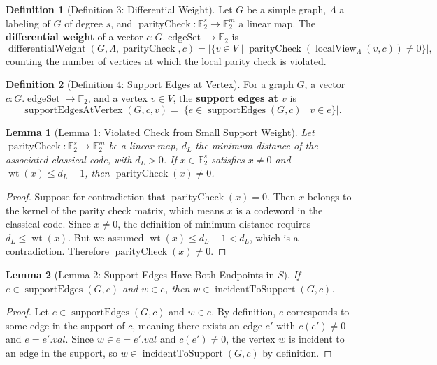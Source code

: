\documentclass[11pt]{article}
\theoremstyle{plain}
\newtheorem*{lemma}{Lemma}
\theoremstyle{definition}
\newtheorem*{definition}{Definition}
\theoremstyle{remark}
\begin{document}
\begin{definition}[Definition 3: Differential Weight]
Let $G$ be a simple graph, $\Lambda$ a labeling of $G$ of degree $s$, and $\operatorname{parityCheck} : \mathbb{F}_2^s \to \mathbb{F}_2^m$ a linear map. The \textbf{differential weight} of a vector $c : G.\operatorname{edgeSet} \to \mathbb{F}_2$ is
\[
\operatorname{differentialWeight}(G, \Lambda, \operatorname{parityCheck}, c) = \bigl|\{v \in V \mid \operatorname{parityCheck}(\operatorname{localView}_\Lambda(v, c)) \neq 0\}\bigr|,
\]
counting the number of vertices at which the local parity check is violated.
\end{definition}

\begin{definition}[Definition 4: Support Edges at Vertex]
For a graph $G$, a vector $c : G.\operatorname{edgeSet} \to \mathbb{F}_2$, and a vertex $v \in V$, the \textbf{support edges at $v$} is
\[
\operatorname{supportEdgesAtVertex}(G, c, v) = \bigl|\{e \in \operatorname{supportEdges}(G, c) \mid v \in e\}\bigr|.
\]
\end{definition}

\begin{lemma}[Lemma 1: Violated Check from Small Support Weight]
Let $\operatorname{parityCheck} : \mathbb{F}_2^s \to \mathbb{F}_2^m$ be a linear map, $d_L$ the minimum distance of the associated classical code, with $d_L > 0$. If $x \in \mathbb{F}_2^s$ satisfies $x \neq 0$ and $\operatorname{wt}(x) \leq d_L - 1$, then $\operatorname{parityCheck}(x) \neq 0$.
\end{lemma}

\begin{proof}
Suppose for contradiction that $\operatorname{parityCheck}(x) = 0$. Then $x$ belongs to the kernel of the parity check matrix, which means $x$ is a codeword in the classical code. Since $x \neq 0$, the definition of minimum distance requires $d_L \leq \operatorname{wt}(x)$. But we assumed $\operatorname{wt}(x) \leq d_L - 1 < d_L$, which is a contradiction. Therefore $\operatorname{parityCheck}(x) \neq 0$.
\end{proof}

\begin{lemma}[Lemma 2: Support Edges Have Both Endpoints in $S$]
If $e \in \operatorname{supportEdges}(G, c)$ and $w \in e$, then $w \in \operatorname{incidentToSupport}(G, c)$.
\end{lemma}

\begin{proof}
Let $e \in \operatorname{supportEdges}(G, c)$ and $w \in e$. By definition, $e$ corresponds to some edge in the support of $c$, meaning there exists an edge $e'$ with $c(e') \neq 0$ and $e = e'.val$. Since $w \in e = e'.val$ and $c(e') \neq 0$, the vertex $w$ is incident to an edge in the support, so $w \in \operatorname{incidentToSupport}(G, c)$ by definition.
\end{proof}
\end{document}
